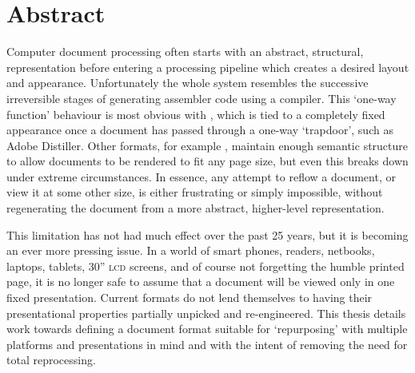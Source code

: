 \cleardoublepage
\begingroup
\let\clearpage\relax
\let\cleardoublepage\relax
\let\cleardoublepage\relax

\chapter*{Abstract}
Computer document processing often starts with an abstract, structural, representation before
entering a processing pipeline which creates a desired layout and appearance. Unfortunately the
whole system resembles the successive irreversible stages of generating assembler code using a
compiler. This `one-way function' behaviour is most obvious with \pdf{}, which is tied to a
completely
fixed appearance once a document has passed through a one-way `trapdoor', such as Adobe Distiller.
Other formats, for example \html{}, maintain enough semantic structure to allow documents to be
rendered to fit any page size, but even this breaks down under extreme circumstances. In essence,
any attempt to reflow a document, or view it at some other size, is either frustrating or simply
impossible, without regenerating the document from a more abstract, higher-level representation.

This limitation has not had much effect over the past 25 years, but it is becoming an ever more
pressing issue. In a world of smart phones, \ebook{} readers, netbooks, laptops, tablets,
30'' \textsc{lcd} screens, and of course not forgetting the humble printed page, it is no longer
safe to assume that a document will be viewed only in one fixed presentation. Current formats do not
lend themselves to having their presentational properties partially unpicked and re-engineered. This
thesis details work towards defining a document format suitable for `repurposing' with multiple
platforms and presentations in mind and with the intent of removing the need for total reprocessing.

\endgroup

\vfill